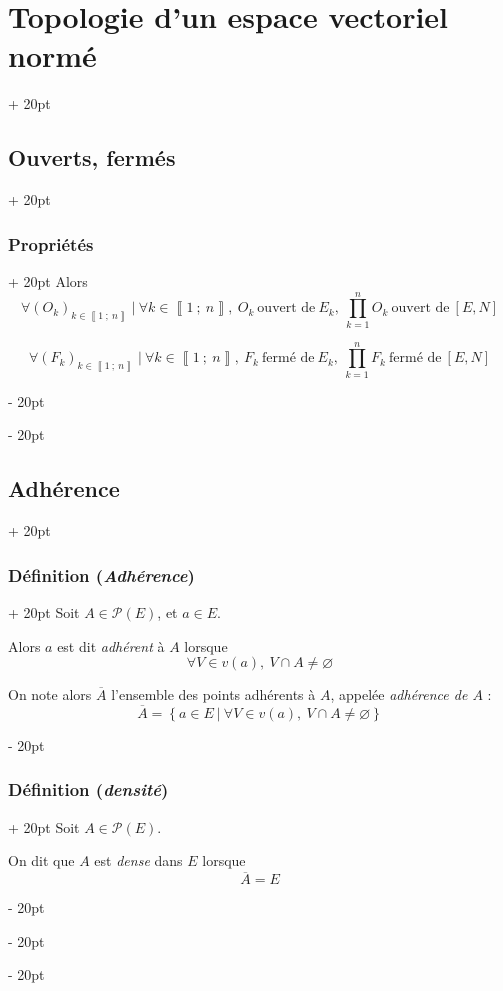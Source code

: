 \documentclass[a4paper, 12pt, twoside]{article}
\newcommand{\nset}[2]{\left\llbracket #1\ ;\ #2 \right\rrbracket}
\newcommand{\cj}[1]{\overline{#1}} %
\newcommand{\set}[1]{\left\{ #1 \right\}}
\newcommand{\ind}[1][20pt]{\advance\leftskip + #1}
\newcommand{\deind}[1][20pt]{\advance\leftskip - #1}
\newenvironment{indt}[2][20pt]{#2 \par \ind[#1]}{\par \deind} %
\begin{document}
\begin{indt}{\section{Topologie d'un espace vectoriel normé}}
\begin{indt}{\subsection{Ouverts, fermés}}
\begin{indt}{\subsubsection{Propriétés}}
                Alors
                \[
                    \forall (O_k)_{k \in \nset 1 n}\ |\ \forall k \in \nset 1 n,\ O_k\ \text{ouvert de}\ E_k,\
                    \prod_{k = 1}^n O_k \ \text{ouvert de}\ [E, N]
                \]

                \[
                    \forall (F_k)_{k \in \nset 1 n}\ |\ \forall k \in \nset 1 n,\ F_k\ \text{fermé de}\ E_k,\
                    \prod_{k = 1}^n F_k \ \text{fermé de}\ [E, N]
                \]
            \end{indt}
        \end{indt}

        \vspace{12pt}
        
        \begin{indt}{\subsection{Adhérence}}
            \begin{indt}{\subsubsection{Définition (\textit{Adhérence})}}
                Soit $A \in \mathcal P(E)$, et $a \in E$.

                Alors $a$ est dit \emph{adhérent} à $A$ lorsque
                \[
                    \forall V \in v(a),\ V \cap A \neq \varnothing
                \]

                On note alors $\cj A$ l'ensemble des points adhérents à $A$, appelée \emph{adhérence de $A$} :
                \[
                    \cj A = \set{a \in E\ |\ \forall V \in v(a),\ V \cap A \neq \varnothing}
                \]
            \end{indt}

            \vspace{12pt}
            
            \begin{indt}{\subsubsection{Définition (\textit{densité})}}
                Soit $A \in \mathcal P(E)$.

                On dit que $A$ est \emph{dense} dans $E$ lorsque
                \[
                    \cj A = E
                \]
            \end{indt}


\end{indt}
\end{indt}
\end{document}
